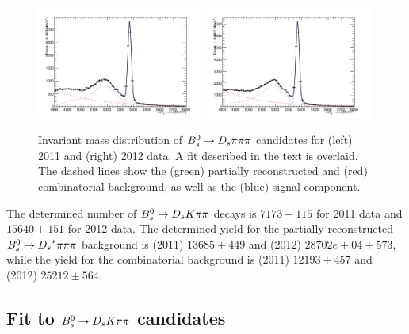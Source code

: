\begin{figure}[h]
\includegraphics[height=7.cm,width=0.49\textwidth]{figs/3pi_BmassFit_11.pdf}
\includegraphics[height=7.cm,width=0.49\textwidth]{figs/3pi_BmassFit_12.pdf}
\caption{Invariant mass distribution of ${{B}^0_{s}}\rightarrow{\ensuremath{{D}_{s}}}{\ensuremath{\pi}}{\ensuremath{\pi}}{\ensuremath{\pi}}$ candidates for (left) 2011 and (right) 2012 data.
A fit described in the text is overlaid. The dashed lines show the (green) partially reconstructed and (red) combinatorial background, as well as the (blue) signal component.}
\label{fig: BsDs3piFit}
\end{figure}

The determined number of ${{B}^0_{s}}\rightarrow{\ensuremath{{D}_{s}}}{\ensuremath{K}}{\ensuremath{\pi}}{\ensuremath{\pi}}$ decays is $7173 \pm 115$ for 2011 data and $15640 \pm 151$ for 2012 data. 
The determined yield for the partially reconstructed ${{B}^0_{s}}\rightarrow{\ensuremath{{D}_{s}}}^{*}{\pi}{\pi}{\pi}$ background is  (2011) $13685 \pm 449$ and (2012)  $28702e+04 \pm 573$, 
while the yield for the combinatorial background is (2011) $12193 \pm 457$ and (2012) $25212 \pm 564$.



\subsection{Fit to ${{B}^0_{s}}\rightarrow{\ensuremath{{D}_{s}}}{\ensuremath{K}}{\ensuremath{\pi}}{\ensuremath{\pi}}$ candidates}
\label{subsec: SigFit}

